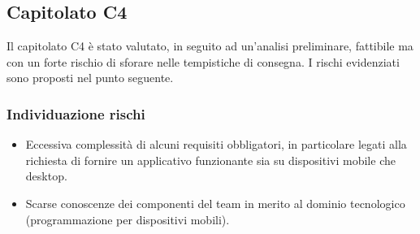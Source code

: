 \subsection{Capitolato C4}
Il capitolato C4 è stato valutato, in seguito ad un'analisi preliminare, fattibile ma con un forte rischio di sforare nelle tempistiche di consegna. I rischi evidenziati sono proposti nel punto seguente.

\subsubsection{Individuazione rischi}
\begin{itemize}
	\item Eccessiva complessità di alcuni requisiti obbligatori, in particolare legati alla richiesta di fornire un applicativo funzionante sia su dispositivi mobile che desktop.
	\item Scarse conoscenze dei componenti del team in merito al dominio tecnologico (programmazione per dispositivi mobili).
\end{itemize}

